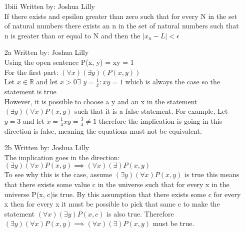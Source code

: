 \documentclass[11pt]{article}
\begin{document}
\begin{flushleft}
\begin{enumerate}[widest={5.2}]
\item[1biii] Written by: Joshua Lilly\\
If there exists and epsilon greater than zero such that for every N in the set of natural numbers there exists an n in the set of natural numbers such that n is greater than or equal to N and then the $|x_n - L| < \epsilon$

\item[2a] Written by: Joshua Lilly\\
Using the open sentence P(x, y) = xy = 1\\
For the first part: $(\forall x)(\exists y)(P(x, y)) $\\
Let $x \in \mathbb{R}$ and let $x > 0 \exists$ $y = \frac{1}{x} : xy = 1$ which is always the case so the statement is true\\
 However, it is possible to choose a y and an x in the statement $(\exists y)(\forall x) P(x, y)$ such that it is a false statement. For example, Let $y = 3$ and let $x = \frac{1}{4} xy = \frac{3}{4} \neq 1$ therefore the implication is going in this direction is false, meaning the equations must not be equivalent.
 
 \item[2b] Written by: Joshua Lilly\\ 
 The implication goes in the direction:
 $(\exists y)(\forall x) P(x, y) \implies (\forall x)(\exists) P(x, y)$\\

To see why this is the case, assume $(\exists y)(\forall x) P(x, y)$ is true this means that there exists some value c in the universe such that for every x in the universe P(x, c)is true. By this assumption that there exists some c for every x then for every x it must be possible to pick that same c to make the statement $(\forall x)(\exists y) P(x, c)$ is also true. Therefore $(\exists y)(\forall x) P(x, y) \implies (\forall x)(\exists) P(x, y)$ must be true.
 
 
\end{enumerate}
\end{flushleft}
\end{document}
